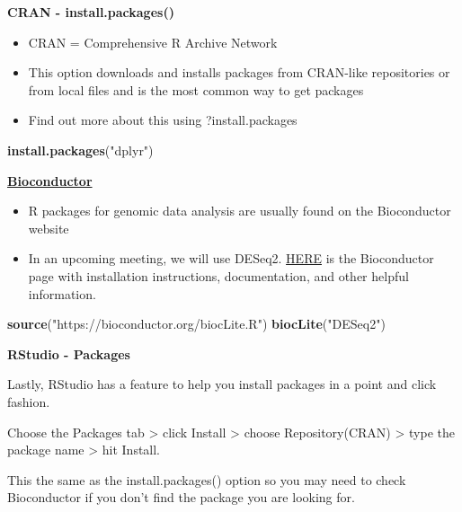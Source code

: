 \documentclass[]{article}
\newenvironment{Shaded}{\begin{snugshade}}{\end{snugshade}}
\newcommand{\KeywordTok}[1]{\textcolor[rgb]{0.13,0.29,0.53}{\textbf{#1}}}
\newcommand{\StringTok}[1]{\textcolor[rgb]{0.31,0.60,0.02}{#1}}
\newcommand{\NormalTok}[1]{#1}
\providecommand{\tightlist}{%
  \setlength{\itemsep}{0pt}\setlength{\parskip}{0pt}}
\begin{document}
\textbf{CRAN - install.packages()}

\begin{itemize}
\tightlist
\item
  CRAN = Comprehensive R Archive Network
\item
  This option downloads and installs packages from CRAN-like
  repositories or from local files and is the most common way to get
  packages
\item
  Find out more about this using ?install.packages
\end{itemize}

\begin{Shaded}
\begin{Highlighting}[]
\KeywordTok{install.packages}\NormalTok{(}\StringTok{"dplyr"}\NormalTok{)}
\end{Highlighting}
\end{Shaded}

\href{https://bioconductor.org/packages/release/BiocViews.html\#___Software}{\textbf{Bioconductor}}

\begin{itemize}
\tightlist
\item
  R packages for genomic data analysis are usually found on the
  Bioconductor website
\item
  In an upcoming meeting, we will use DESeq2.
  \href{https://bioconductor.org/packages/release/bioc/html/DESeq2.html}{HERE}
  is the Bioconductor page with installation instructions,
  documentation, and other helpful information.
\end{itemize}

\begin{Shaded}
\begin{Highlighting}[]
\KeywordTok{source}\NormalTok{(}\StringTok{"https://bioconductor.org/biocLite.R"}\NormalTok{)}
\KeywordTok{biocLite}\NormalTok{(}\StringTok{"DESeq2"}\NormalTok{)}
\end{Highlighting}
\end{Shaded}

\textbf{RStudio - Packages}

Lastly, RStudio has a feature to help you install packages in a point
and click fashion.

Choose the Packages tab \textgreater{} click Install \textgreater{}
choose Repository(CRAN) \textgreater{} type the package name
\textgreater{} hit Install.

This the same as the install.packages() option so you may need to check
Bioconductor if you don't find the package you are looking for.
\end{document}

